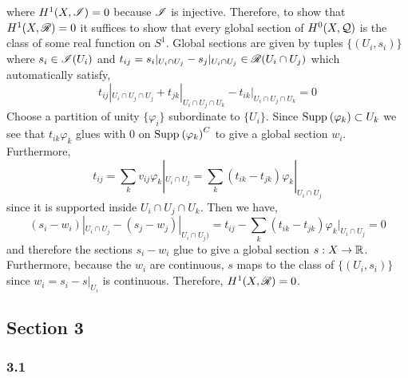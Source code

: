 \documentclass[12pt]{article}
\begin{document}
where $H^1(X, \mathscr{I}) = 0$ because $\mathscr{I}$ is injective. Therefore, to show that $H^1(X, \mathscr{R}) = 0$ it suffices to show that every global section of $H^0(X, \mathcal{Q})$ is the class of some real function on $S^1$.  Global sections are given by tuples $\{(U_i, s_i)\}$ where $s_i \in \mathscr{I}(U_i)$ and $t_{ij} = s_i |_{U_i \cap U_j} - s_j |_{U_i \cap U_j} \in \mathscr{R}(U_i \cap U_j)$ which automatically satisfy,
\[ t_{ij} |_{U_i \cap U_j \cap U_j} + t_{jk} |_{U_i \cap U_j \cap U_k} - t_{ik} |_{U_i \cap U_j \cap U_k} = 0 \]
Choose a partition of unity $\{ \varphi_i \}$ subordinate to $\{ U_i \}$. Since $\mathrm{Supp}_{} \left( \varphi_k \right) \subset U_k$ we see that $t_{ik} \varphi_k$ glues with $0$ on $\mathrm{Supp}_{} \left( \varphi_k \right)^C$ to give a global section $w_i$. Furthermore,
\[ t_{ij} = \sum_k v_{ij} \varphi_k |_{U_i \cap U_j} = \sum_k (t_{ik} - t_{jk}) \varphi_k |_{U_i \cap U_j} \]
since it is supported inside $U_i \cap U_j \cap U_k$. 
Then we have,
\[ (s_i - w_i)|_{U_i \cap U_j} - (s_j - w_j)|_{U_i \cap U_j)} = t_{ij} - \sum_k (t_{ik} - t_{jk}) \varphi_k |_{U_i \cap U_j} = 0 \]
and therefore the sections $s_i - w_i$ glue to give a global section $s : X \to \mathbb{R}$. Furthermore, because the $w_i$ are continuous, $s$ maps to the class of $\{(U_i, s_i)\}$ since $w_i = s_i - s|_{U_i}$ is continuous. Therefore, $H^1(X, \mathscr{R}) = 0$.


\subsection{Section 3}

\subsubsection{3.1}
\end{document}

